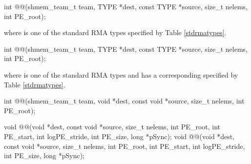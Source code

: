 
\begin{apidefinition}

\begin{C11synopsis}
int @@(shmem_team_t team, TYPE *dest, const TYPE *source, size_t nelems, int PE_root);
\end{C11synopsis}
where \TYPE{} is one of the standard \ac{RMA} types specified by Table \ref{stdrmatypes}.

\begin{Csynopsis}
\end{Csynopsis}
\begin{CsynopsisCol}
int @@(shmem_team_t team, TYPE *dest, const TYPE *source, size_t nelems, int PE_root);
\end{CsynopsisCol}
where \TYPE{} is one of the standard \ac{RMA} types and has a corresponding \TYPENAME{} specified by Table \ref{stdrmatypes}.

\begin{CsynopsisCol}
int @@(shmem_team_t team, void *dest, const void *source, size_t nelems, int PE_root);
\end{CsynopsisCol}

\begin{DeprecateBlock}
\begin{CsynopsisCol}
void @@(void *dest, const void *source, size_t nelems, int PE_root, int PE_start, int logPE_stride, int PE_size, long *pSync);
void @@(void *dest, const void *source, size_t nelems, int PE_root, int PE_start, int logPE_stride, int PE_size, long *pSync);
\end{CsynopsisCol}
\end{DeprecateBlock}

\begin{apiarguments}

%



\end{apiarguments}
\end{apidefinition}
